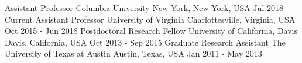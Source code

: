 \begin{cventries}
  \cventry
    {Assistant Professor}
    {Columbia University}
    {New York, New York, USA}
    {Jul 2018 - Current}
    {
    }
     \vspace{-6mm}
  \cventry
    {Assistant Professor}
    {University of Virginia}
    {Charlottesville, Virginia, USA}
    {Oct 2015 - Jun 2018}
    {
    }
     \vspace{-6mm}
  \cventry
    {Postdoctoral Research Fellow}
    {University of California, Davis}
    {Davis, California, USA}
    {Oct 2013 - Sep 2015}
    {
    }
     \vspace{-6mm}
   \cventry
    {Graduate Research Assistant}
    {The University of Texas at Austin}
    {Austin, Texas, USA}
    {Jan 2011 - May 2013}
    {
    }
     \vspace{-6mm}
\end{cventries}
